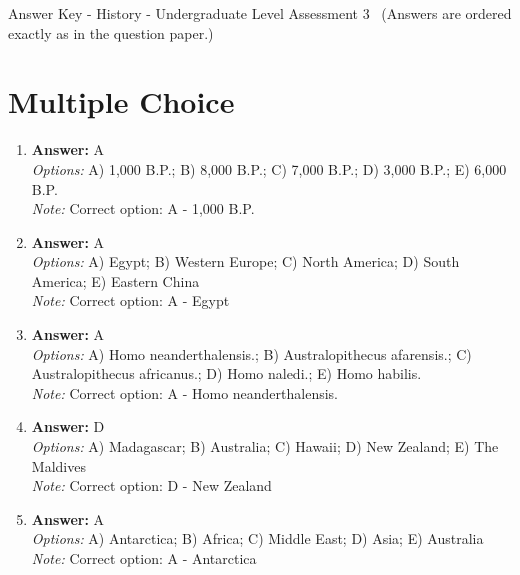 \documentclass[12pt]{article}
\begin{document}
\begin{center}
Answer Key - History - Undergraduate Level Assessment 3 \
\small (Answers are ordered exactly as in the question paper.)
\end{center}

\section*{Multiple Choice}
\begin{enumerate}[label=\arabic*.]
\item \textbf{Answer:} A
\\ \textit{Options:} A) 1,000 B.P.; B) 8,000 B.P.; C) 7,000 B.P.; D) 3,000 B.P.; E) 6,000 B.P.
\\ \textit{Note:} Correct option: A - 1,000 B.P.
\item \textbf{Answer:} A
\\ \textit{Options:} A) Egypt; B) Western Europe; C) North America; D) South America; E) Eastern China
\\ \textit{Note:} Correct option: A - Egypt
\item \textbf{Answer:} A
\\ \textit{Options:} A) Homo neanderthalensis.; B) Australopithecus afarensis.; C) Australopithecus africanus.; D) Homo naledi.; E) Homo habilis.
\\ \textit{Note:} Correct option: A - Homo neanderthalensis.
\item \textbf{Answer:} D
\\ \textit{Options:} A) Madagascar; B) Australia; C) Hawaii; D) New Zealand; E) The Maldives
\\ \textit{Note:} Correct option: D - New Zealand
\item \textbf{Answer:} A
\\ \textit{Options:} A) Antarctica; B) Africa; C) Middle East; D) Asia; E) Australia
\\ \textit{Note:} Correct option: A - Antarctica
\end{enumerate}
\end{document}
